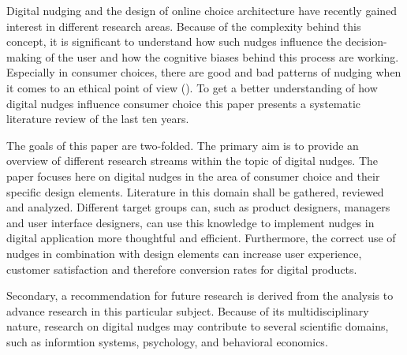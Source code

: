 Digital nudging and the design of online choice architecture have recently gained interest in different research areas. Because of the complexity behind this concept, it is significant to understand how such nudges influence the decision-making of the user and how the cognitive biases behind this process are working. Especially in consumer choices, there are good and bad patterns of nudging when it comes to an ethical point of view (\cite{sunstein_nudging_2015}). To get a better understanding of how digital nudges influence consumer choice this paper presents a systematic literature review of the last ten years. 


The goals of this paper are two-folded. The primary aim is to provide an overview of different research streams within the topic of digital nudges. The paper focuses here on digital nudges in the area of consumer choice and their specific design elements. Literature in this domain shall be gathered, reviewed and analyzed. Different target groups can, such as product designers, managers and user interface designers, can use this knowledge to implement nudges in digital application more thoughtful and efficient. Furthermore, the correct use of nudges in combination with design elements can increase user experience, customer satisfaction and therefore conversion rates for digital products.

Secondary, a recommendation for future research is derived from the analysis to advance research in this particular subject. Because of its multidisciplinary nature, research on digital nudges may contribute to several scientific domains, such as informtion systems, psychology, and behavioral economics.
